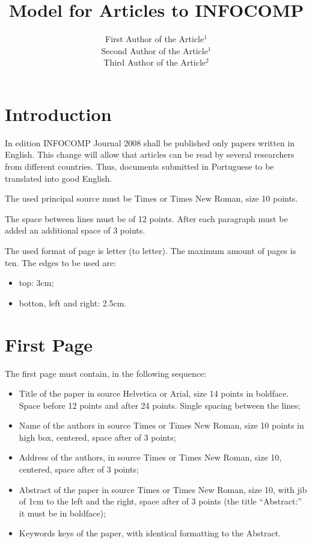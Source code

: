 \documentclass[10pt]{article}
\title{Model for Articles to INFOCOMP}
\author{
        First Author of the Article$^1$ \\
        Second Author of the Article$^1$ \\
        Third Author of the Article$^2$
}
\begin{document}
\maketitle


\newpage

\section{Introduction}

In edition INFOCOMP Journal 2008 shall be published only papers
written in English. This change will allow that articles can be read
by several researchers from different countries. Thus, documents
submitted in Portuguese to be translated into good English.

The used principal source must be Times or Times
New Roman, size 10 points.

The space between lines must be of 12 points. After each paragraph
must be added an additional space of 3 points.

The used format of page is letter (to letter). The maximum amount of
pages is ten. The edges to be used are:
\begin{itemize}
\item top: 3cm;
\item botton, left and right: 2.5cm.
\end{itemize}

\section{First Page}

The first page must contain, in the following sequence:

\begin{itemize}
\item Title of the paper in source Helvetica or Arial, size 14 points
in boldface. Space before 12 points and after 24 points. Single
spacing between the lines;
\item Name of the authors in source Times or Times New Roman, size 10
points in high box, centered, space after of 3 points;
\item Address of the authors, in source Times or Times New Roman, size
10, centered, space after of 3 points;
\item Abstract of the paper in source Times or Times New Roman, size
10, with jib of 1cm to the left and the right, space after of 3 points
(the title ``Abstract:'' it must be in boldface);
\item Keywords keys of the paper, with identical formatting to the Abstract.
\end {itemize} 
\end{document}
